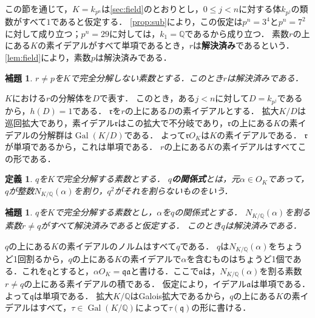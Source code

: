 \documentclass[11pt,a4paper]{ltjsarticle}
\makeatletter
\theoremstyle{ja}
\newtheorem{lemma}[theorem]{補題}
\newtheorem{definition}[theorem]{定義}
\renewenvironment{proof}[1][証明]{\par
  \pushQED{\qed}\normalfont \topsep6\p@\@plus6\p@\relax
  \trivlist
  \item[\hskip\labelsep\bfseries #1]\hspace{1\zw}\ignorespaces
}{\popQED\endtrivlist\@endpefalse}
\makeatother
\begin{document}
この節を通じて，$K = k_{p^n}$は\cref{sec:field}のとおりとし，$0 \le j < n$に対する体$k_{p^j}$の類数がすべて$1$であると仮定する．
\cref{prop:sub}により，この仮定は$p^n = 3^4$と$p^n = 7^2$に対して成り立つ；$p^n = 29$に対しては，$k_1 = \mathbb{Q}$であるから成り立つ．
素数$r$の上にある$K$の素イデアルがすべて単項であるとき，$r$は\textbf{解決済み}であるという．
\cref{lem:field}により，素数$p$は解決済みである．

\begin{lemma} \label{lem:nonsplit}
$r \ne p$を$K$で完全分解しない素数とする．このとき$r$は解決済みである．
\end{lemma}

\begin{proof}
$K$における$r$の分解体を$D$で表す．
このとき，ある$j < n$に対して$D = k_{p^j}$であるから，$h(D) = 1$である．
$\mathfrak{r}$を$r$の上にある$D$の素イデアルとする．
拡大$K/D$は巡回拡大であり，素イデアル$\mathfrak{r}$はこの拡大で不分岐であり，$\mathfrak{r}$の上にある$K$の素イデアルの分解群は$\operatorname{Gal}(K/D)$である．
よって$\mathfrak{r} O_K$は$K$の素イデアルである．
$\mathfrak{r}$が単項であるから，これは単項である．
$r$の上にある$K$の素イデアルはすべてこの形である．
\end{proof}

\begin{definition} \label{def:relation}
$q$を$K$で完全分解する素数とする．
\textbf{$q$の関係式}とは，元$\alpha \in O_K$であって，$q$が整数$N_{K/\mathbb{Q}}(\alpha)$を割り，$q^2$がそれを割らないものをいう．
\end{definition}

\begin{lemma} \label{lem:relation}
$q$を$K$で完全分解する素数とし，$\alpha$を$q$の関係式とする．
$N_{K/\mathbb{Q}}(\alpha)$を割る素数$r \ne q$がすべて解決済みであると仮定する．
このとき$q$は解決済みである．
\end{lemma}

\begin{proof}
$q$の上にある$K$の素イデアルのノルムはすべて$q$である．
$q$は$N_{K/\mathbb{Q}}(\alpha)$をちょうど1回割るから，$q$の上にある$K$の素イデアルで$\alpha$を含むものはちょうど1個である．これを$\mathfrak{q}$とすると，$\alpha O_K = \mathfrak{q} \mathfrak{a}$と書ける．ここで$\mathfrak{a}$は，$N_{K/\mathbb{Q}}(\alpha)$を割る素数$r \ne q$の上にある素イデアルの積である．
仮定により，イデアル$\mathfrak{a}$は単項である．
よって$\mathfrak{q}$は単項である．
拡大$K/\mathbb{Q}$はGalois拡大であるから，$q$の上にある$K$の素イデアルはすべて，$\tau \in \operatorname{Gal}(K/\mathbb{Q})$によって$\tau(\mathfrak{q})$の形に書ける．
\end{proof}
\end{document}
